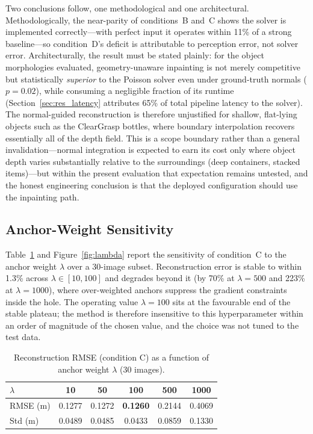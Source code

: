 Two conclusions follow, one methodological and one architectural.
Methodologically, the near-parity of conditions~B and~C shows the solver is
implemented correctly---with perfect input it operates within 11\% of a strong
baseline---so condition~D's deficit is attributable to perception error, not
solver error. Architecturally, the result must be stated plainly: for the
object morphologies evaluated, geometry-unaware inpainting is not merely
competitive but statistically \emph{superior} to the Poisson solver even under
ground-truth normals ($p = 0.02$), while consuming a negligible fraction of
its runtime (Section~\ref{sec:res_latency} attributes 65\% of total pipeline
latency to the solver). The normal-guided reconstruction is therefore
unjustified for shallow, flat-lying objects such as the ClearGrasp bottles,
where boundary interpolation recovers essentially all of the depth field. This
is a scope boundary rather than a general invalidation---normal integration is
expected to earn its cost only where object depth varies substantially
relative to the surroundings (deep containers, stacked items)---but within the
present evaluation that expectation remains untested, and the honest
engineering conclusion is that the deployed configuration should use the
inpainting path.
\subsection{Anchor-Weight Sensitivity}
\label{subsec:res_lambda}

Table~\ref{tab:lambda_results} and Figure~\ref{fig:lambda} report the sensitivity of condition~C to the anchor weight $\lambda$ over a 30-image subset. Reconstruction error is stable to within 1.3\% across $\lambda \in [10, 100]$ and degrades beyond it (by 70\% at $\lambda = 500$ and 223\% at $\lambda = 1000$), where over-weighted anchors suppress the gradient constraints inside the hole. The operating value $\lambda = 100$ sits at the favourable end of the stable plateau; the method is therefore insensitive to this hyperparameter within an order of magnitude of the chosen value, and the choice was not tuned to the test data.

\begin{table}[htbp]
    \centering
    \caption{Reconstruction RMSE (condition C) as a function of anchor weight $\lambda$ (30 images).}
    \label{tab:lambda_results}
    \begin{tabular}{lccccc}
        \toprule
        $\lambda$ & 10 & 50 & 100 & 500 & 1000 \\
        \midrule
        RMSE (m) & 0.1277 & 0.1272 & \textbf{0.1260} & 0.2144 & 0.4069 \\
        Std (m) & 0.0489 & 0.0485 & 0.0433 & 0.0859 & 0.1330 \\
        \bottomrule
    \end{tabular}
\end{table}

